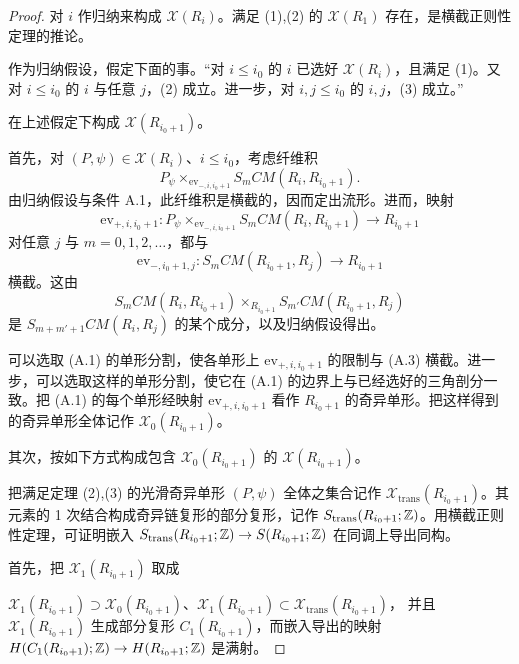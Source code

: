 \begin{proof}
  对 $i$ 作归纳来构成 $\mathcal{X}(R_i)$。满足 (1),(2) 的 $\mathcal{X}(R_1)$ 存在，是横截正则性定理的推论。

  作为归纳假设，假定下面的事。“对 $i\le i_0$ 的 $i$ 已选好 $\mathcal{X}(R_i)$，且满足 (1)。又对 $i\le i_0$ 的 $i$ 与任意 $j$，(2) 成立。进一步，对 $i,j\le i_0$ 的 $i,j$，(3) 成立。”

  在上述假定下构成 $\mathcal{X}(R_{i_0+1})$。

  首先，对 $(P,\psi)\in\mathcal{X}(R_i)$、$i\le i_0$，考虑纤维积
  \begin{equation}
    P_\psi\times_{\mathrm{ev}_{-,i,i_0+1}}S_mCM(R_i,R_{i_0+1}). \tag{A.1}
  \end{equation}
  由归纳假设与条件 A.1，此纤维积是横截的，因而定出流形。进而，映射
  \begin{equation}
    \mathrm{ev}_{+,i,i_0+1}\colon
    P_\psi\times_{\mathrm{ev}_{-,i,i_0+1}}S_mCM(R_i,R_{i_0+1})\to R_{i_0+1} \tag{A.2}
  \end{equation}
  对任意 $j$ 与 $m=0,1,2,\dots$，都与
  \begin{equation}
    \mathrm{ev}_{-,i_0+1,j}\colon S_mCM(R_{i_0+1},R_j)\to R_{i_0+1} \tag{A.3}
  \end{equation}
  横截。这由
  \[
    S_mCM(R_i,R_{i_0+1})\times_{R_{i_0+1}}S_{m'}CM(R_{i_0+1},R_j)
  \]
  是 $S_{m+m'+1}CM(R_i,R_j)$ 的某个成分，以及归纳假设得出。

  可以选取 (A.1) 的单形分割，使各单形上 $\mathrm{ev}_{+,i,i_0+1}$ 的限制与 (A.3) 横截。进一步，可以选取这样的单形分割，使它在 (A.1) 的边界上与已经选好的三角剖分一致。把 (A.1) 的每个单形经映射 $\mathrm{ev}_{+,i,i_0+1}$ 看作 $R_{i_0+1}$ 的奇异单形。把这样得到的奇异单形全体记作 $\mathcal{X}_0(R_{i_0+1})$。

  其次，按如下方式构成包含 $\mathcal{X}_0(R_{i_0+1})$ 的 $\mathcal{X}(R_{i_0+1})$。

  把满足定理 (2),(3) 的光滑奇异单形 $(P,\psi)$ 全体之集合记作 $\mathcal{X}_{\mathrm{trans}}(R_{i_0+1})$。其元素的 1 次结合构成奇异链复形的部分复形，记作 $S_{\mathrm{trans}}(R_{i_0+1};\mathbb{Z})$。用横截正则性定理，可证明嵌入 $S_{\mathrm{trans}}(R_{i_0+1};\mathbb{Z})\to S(R_{i_0+1};\mathbb{Z})$ 在同调上导出同构。

  首先，把 $\mathcal{X}_1(R_{i_0+1})$ 取成

  $\mathcal{X}_1(R_{i_0+1})\supset\mathcal{X}_0(R_{i_0+1})$、$\mathcal{X}_1(R_{i_0+1})\subset\mathcal{X}_{\mathrm{trans}}(R_{i_0+1})$，
  并且 $\mathcal{X}_1(R_{i_0+1})$ 生成部分复形 $C_1(R_{i_0+1})$，而嵌入导出的映射 $H(C_1(R_{i_0+1});\mathbb{Z})\to H(R_{i_0+1};\mathbb{Z})$ 是满射。


\end{proof}
